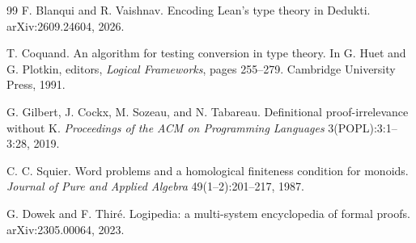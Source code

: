 \documentclass[11pt]{article}
\theoremstyle{definition}
\theoremstyle{remark}
\begin{document}
\begin{thebibliography}{99}
F. Blanqui and R. Vaishnav.
\newblock Encoding Lean's type theory in Dedukti.
\newblock arXiv:2609.24604, 2026.

T. Coquand.
\newblock An algorithm for testing conversion in type theory.
\newblock In G. Huet and G. Plotkin, editors, \emph{Logical Frameworks}, pages
  255--279. Cambridge University Press, 1991.

G. Gilbert, J. Cockx, M. Sozeau, and N. Tabareau.
\newblock Definitional proof-irrelevance without K.
\newblock \emph{Proceedings of the ACM on Programming Languages} 3(POPL):3:1--3:28,
  2019.

C. C. Squier.
\newblock Word problems and a homological finiteness condition for monoids.
\newblock \emph{Journal of Pure and Applied Algebra} 49(1--2):201--217, 1987.

G. Dowek and F. Thir\'e.
\newblock Logipedia: a multi-system encyclopedia of formal proofs.
\newblock arXiv:2305.00064, 2023.

\end{thebibliography}
\end{document}
